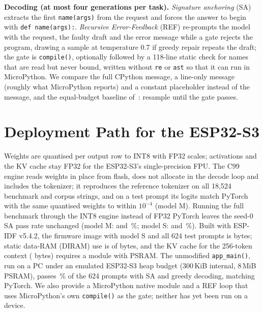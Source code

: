 \documentclass[journal]{IEEEtran}
\begin{document}
\textbf{Decoding (at most four generations per task).} \emph{Signature anchoring} (SA) extracts the first \texttt{name(args)} from the request and forces the answer to begin with \texttt{def name(args):}. \emph{Recursive Error-Feedback} (REF) re-prompts the model with the request, the faulty draft and the error message while a gate rejects the program, drawing a sample at temperature 0.7 if greedy repair repeats the draft; the gate is \texttt{compile()}, optionally followed by a 118-line static check for names that are read but never bound, written without \texttt{re} or \texttt{ast} so that it can run in MicroPython. We compare the full CPython message, a line-only message (roughly what MicroPython reports) and a constant placeholder instead of the message, and the equal-budget baseline of~\cite{olausson2024selfrepair}: resample until the gate passes.

\section{Deployment Path for the ESP32-S3}
Weights are quantised per output row to INT8 with FP32 scales; activations and the KV cache stay FP32 for the ESP32-S3's single-precision FPU. The C99 engine reads weights in place from flash, does not allocate in the decode loop and includes the tokenizer; it reproduces the reference tokenizer on all 18{,}524 benchmark and corpus strings, and on a test prompt its logits match PyTorch with the same quantised weights to within $10^{-4}$ (model M). Running the full benchmark through the INT8 engine instead of FP32 PyTorch leaves the seed-0 SA pass rate unchanged (model M: \ablFinalanchorpass{} and \ablIntanchorpass\,\%; model S: \ablSmallanchorpass{} and \ablSmallintanchorpass\,\%). Built with ESP-IDF v5.4.2, the firmware image with model S and all 624 test prompts is \idfappbytes{} bytes; static data-RAM (DIRAM) use is \idfdiramusedbytes{} of \idfdiramtotalbytes{} bytes, and the KV cache for the 256-token context (\dsmkvcachebytes{} bytes) requires a module with PSRAM. The unmodified \texttt{app\_main()}, run on a PC under an emulated ESP32-S3 heap budget (300\,KiB internal, 8\,MiB PSRAM), passes \dsmhostsimgreedypasspct\,\% of the 624 prompts with SA and greedy decoding, matching PyTorch. We also provide a MicroPython native module and a REF loop that uses MicroPython's own \texttt{compile()} as the gate; neither has yet been run on a device.
\end{document}
